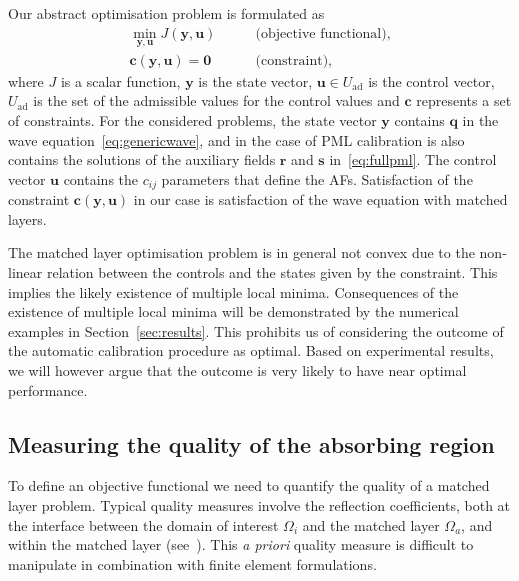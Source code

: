 \documentclass[a4paper]{article}
\renewcommand{\vec}{\boldsymbol}
\begin{document}
Our abstract optimisation problem is formulated as
\begin{align}
  \min_{\vec{y}, \vec{u}} J(\vec{y}, \vec{u})
  &\qquad \text{(objective functional)},
  \\
  \vec{c}(\vec{y}, \vec{u}) = \vec{0}  &\qquad \text{(constraint)},
\end{align}
where $J$ is a scalar function, $\vec{y}$ is the state vector,
$\vec{u} \in U_\text{ad}$ is the control vector, $U_\text{ad}$ is the
set of the admissible values for the control values and $\vec{c}$
represents a set of constraints. For the considered problems, the
state vector $\vec{y}$ contains $\vec{q}$ in the wave
equation~\eqref{eq:genericwave}, and in the case of PML calibration is
also contains the solutions of the auxiliary fields $\vec{r}$ and
$\vec{s}$ in~\eqref{eq:fullpml}. The control vector $\vec{u}$ contains
the $c_{ij}$ parameters that define the AFs. Satisfaction of the
constraint $\vec{c}(\vec{y}, \vec{u})$ in our case is satisfaction of
the wave equation with matched layers.

The matched layer optimisation problem is in general not convex due to
the non-linear relation between the controls and the states given by
the constraint. This implies the likely existence of multiple local
minima. Consequences of the existence of multiple local minima will be
demonstrated by the numerical examples in
Section~\ref{sec:results}. This prohibits us of considering the
outcome of the automatic calibration procedure as optimal. Based on
experimental results, we will however argue that the outcome is very
likely to have near optimal performance.

\subsection{Measuring the quality of the absorbing region}
\label{sec:quality}

To define an objective functional we need to quantify the quality of a
matched layer problem. Typical quality measures involve the reflection
coefficients, both at the interface between the domain of interest
$\Omega_i$ and the matched layer $\Omega_a$, and within the matched
layer (see~\citep{chew96jin}). This \emph{a priori} quality measure is
difficult to manipulate in combination with finite element
formulations.
\end{document}
